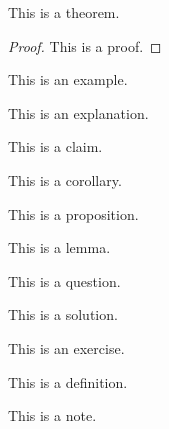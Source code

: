 \begin{theorem}
This is a theorem.
\end{theorem}
\begin{proof}
This is a proof.
\end{proof}
\begin{example}
This is an example.
\end{example}
\begin{explanation}
This is an explanation.
\end{explanation}
\begin{claim}
This is a claim.
\end{claim}
\begin{corollary}
This is a corollary.
\end{corollary}
\begin{prop}
This is a proposition.
\end{prop}
\begin{lemma}
This is a lemma.
\end{lemma}
\begin{question}
This is a question.
\end{question}
\begin{solution}
This is a solution.
\end{solution}
\begin{exercise}
This is an exercise.
\end{exercise}
\begin{definition}[Definition]
This is a definition.
\end{definition}
\begin{note}
This is a note.
\end{note}


\newpage